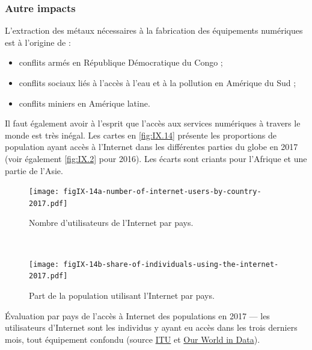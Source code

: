 \subsubsection[Autre impacts]{Autre impacts}
\label{subsub:IX.4.2.4}


L'extraction des métaux nécessaires à la fabrication des équipements numériques est à l'origine de :
\begin{itemize}
\item conflits armés en République Démocratique du Congo ;
\item conflits sociaux liés à l'accès à l'eau et à la pollution en Amérique du Sud ;
\item conflits miniers en Amérique latine.
\end{itemize}


Il faut également avoir à l'esprit que l'accès aux services numériques à travers le monde est très inégal. Les cartes en \cref{fig:IX.14} présente les proportions de population ayant accès à l'Internet dans les différentes parties du globe en 2017 (voir également \cref{fig:IX.2} pour 2016). Les écarts sont criants pour l'Afrique et une partie de l'Asie. %


\begin{jazzfigure*}
\begin{subfigure}{\linewidth}
\Centering
\texttt{[image: figIX-14a-number-of-internet-users-by-country-2017.pdf]}
\caption{\label{figIX.14a}Nombre d'utilisateurs de l'Internet par pays.}
\end{subfigure}\\[6pt]
\begin{subfigure}{\linewidth}
\Centering
\texttt{[image: figIX-14b-share-of-individuals-using-the-internet-2017.pdf]}
\caption{\label{figIX.14b}Part de la population utilisant l'Internet par pays.}
\end{subfigure}
\caption{\label{fig:IX.14}Évaluation par pays de l'accès à Internet des populations en 2017 --- les utilisateurs d'Internet sont les individus y ayant eu accès dans les trois derniers mois, tout équipement confondu (source \href{https://www.itu.int/fr/Pages/default.aspx}{ITU} et \href{https://ourworldindata.org/internet}{Our World in Data}).}
\vspace{-4pt}
\end{jazzfigure*}

